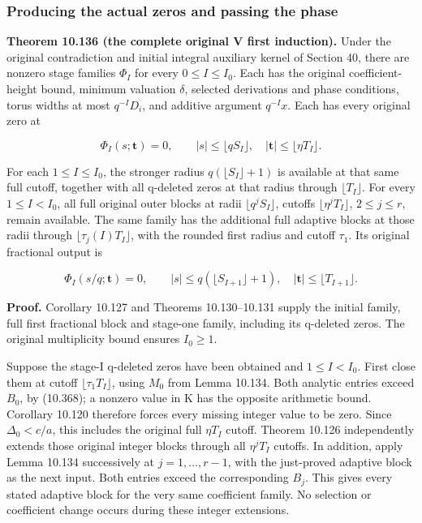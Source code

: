 \documentclass[
  11pt,
  a4paper,
]{article}
\begin{document}
\subsubsection{Producing the actual zeros and passing the
phase}\label{producing-the-actual-zeros-and-passing-the-phase}

\textbf{Theorem 10.136 (the complete original V first induction).} Under
the original contradiction and initial integral auxiliary kernel of
Section 40, there are nonzero stage families \(\Phi_I\) for every
\(0\le I\le I_0\). Each has the original coefficient-height bound,
minimum valuation \(\delta\), selected derivations and phase conditions,
torus widths at most \(q^{-I}D_i\), and additive argument \(q^{-I}x\).
Each has every original zero at

\[
\Phi_I(s;\boldsymbol t)=0,
\qquad |s|\le\lfloor qS_I\rfloor,\quad
|\boldsymbol t|\le\lfloor\eta T_I\rfloor.
\tag{10.377}
\]

For each \(1\le I\le I_0\), the stronger radius
\(q(\lfloor S_I\rfloor+1)\) is available at that same full cutoff,
together with all q-deleted zeros at that radius through
\(\lfloor T_I\rfloor\). For every \(1\le I<I_0\), all full original
outer blocks at radii \(\lfloor q^jS_I\rfloor\), cutoffs
\(\lfloor\eta^jT_I\rfloor\), \(2\le j\le r\), remain available. The same
family has the additional full adaptive blocks at those radii through
\(\lfloor\tau_j(I)T_I\rfloor\), with the rounded first radius and cutoff
\(\tau_1\). Its original fractional output is

\[
\Phi_I(s/q;\boldsymbol t)=0,
\qquad |s|\le q(\lfloor S_{I+1}\rfloor+1),\quad
|\boldsymbol t|\le\lfloor T_{I+1}\rfloor.
\tag{10.378}
\]

\textbf{Proof.} Corollary 10.127 and Theorems 10.130--10.131 supply the
initial family, full first fractional block and stage-one family,
including its q-deleted zeros. The original multiplicity bound ensures
\(I_0\ge1\).

Suppose the stage-I q-deleted zeros have been obtained and
\(1\le I<I_0\). First close them at cutoff \(\lfloor\tau_1T_I\rfloor\),
using \(M_0\) from Lemma 10.134. Both analytic entries exceed \(B_0\),
by (10.368); a nonzero value in K has the opposite arithmetic bound.
Corollary 10.120 therefore forces every missing integer value to be
zero. Since \(\Delta_0<c/a\), this includes the original full
\(\eta T_I\) cutoff. Theorem 10.126 independently extends those original
integer blocks through all \(\eta^jT_I\) cutoffs. In addition, apply
Lemma 10.134 successively at \(j=1,\ldots,r-1\), with the just-proved
adaptive block as the next input. Both entries exceed the corresponding
\(B_j\). This gives every stated adaptive block for the very same
coefficient family. No selection or coefficient change occurs during
these integer extensions.
\end{document}
